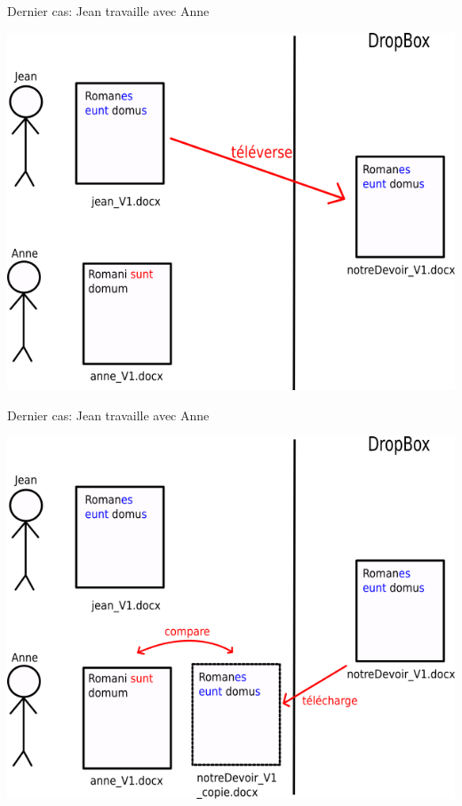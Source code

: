 \documentclass{beamer}
\begin{document}
\begin{frame}{Dernier cas: Jean travaille avec Anne}
\begin{center}
    \includegraphics[scale=0.4]{images/lastScenario/lastScenario_pullpush2.png}
\end{center}
\end{frame}

\begin{frame}{Dernier cas: Jean travaille avec Anne}
\begin{center}
    \includegraphics[scale=0.4]{images/lastScenario/lastScenario_pullpush3.png}
\end{center}
\end{frame}
\end{document}
